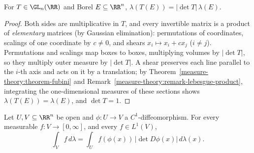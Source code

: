 \begin{lemma}\label{measure-theory:lemma-linear-change}
For $T \in \GL_n(\RR)$ and Borel $E \subseteq \RR^n$, $\lambda(T(E)) = |\det T|\,\lambda(E)$.
\end{lemma}

\begin{proof}
Both sides are multiplicative in $T$, and every invertible matrix is a product of \emph{elementary} matrices (by Gaussian elimination): permutations of coordinates, scalings of one coordinate by
$c \neq 0$, and shears $x_i \mapsto x_i + cx_j$ ($i \neq j$). Permutations and scalings map boxes to boxes, multiplying volumes by $|\det T|$, so they multiply outer measure by $|\det T|$. A shear preserves each
line parallel to the $i$-th axis and acts on it by a translation; by Theorem~\ref{measure-theory:theorem-fubini} and Remark~\ref{measure-theory:remark-lebesgue-product}, integrating the one-dimensional
measures of these sections shows $\lambda(T(E)) = \lambda(E)$, and $\det T = 1$.
\end{proof}

\begin{theorem}\label{measure-theory:theorem-change-of-variables}
Let $U, V \subseteq \RR^n$ be open and $\phi \colon U \to V$ a $C^1$-diffeomorphism. For every measurable $f \colon V \to [0, \infty]$, and every $f \in L^1(V)$,
\[
\int_Vf\,d\lambda = \int_Uf(\phi(x))\,|\det D\phi(x)|\,d\lambda(x).
\]
\end{theorem}

